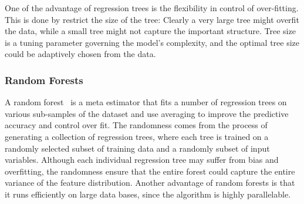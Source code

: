One of the advantage of regression trees is the flexibility in control of over-fitting.
This is done by restrict the size of the tree: Clearly a very large tree might overfit the data, while a small tree might not capture the important structure.
Tree size is a tuning parameter governing the model's complexity, and the optimal tree size could be adaptively chosen from the data.

\subsubsection{Random Forests}
\label{ssub:random_forests}
A random forest~\cite{breiman2001random} is a meta estimator that fits a number of regression trees on various sub-samples of the dataset and use averaging to improve the predictive accuracy and control over fit.
The randomness comes from the process of generating a collection of regression trees, where each tree is trained on a randomly selected subset of training data and a randomly subset of input variables.
Although each individual regression tree may suffer from bias and overfitting, the randomness ensure that the entire forest could capture the entire variance of the feature distribution.
Another advantage of random forests is that it runs efficiently on large data bases, since the algorithm is highly parallelable.

